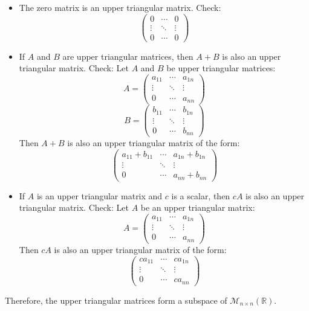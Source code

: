 \documentclass{article}
\begin{document}
\begin{itemize}
\item The zero matrix is an upper triangular matrix. Check:
\[
\begin{pmatrix}
0 & \cdots & 0 \\
\vdots & \ddots & \vdots \\
0 & \cdots & 0
\end{pmatrix}
\]
\item If $A$ and $B$ are upper triangular matrices, then $A + B$ is also an upper triangular matrix. Check:
Let $A$ and $B$ be upper triangular matrices:
\[
A = \begin{pmatrix}
a_{11} & \cdots & a_{1n} \\
\vdots & \ddots & \vdots \\
0 & \cdots & a_{nn}
\end{pmatrix}
\]
\[
B = \begin{pmatrix}
b_{11} & \cdots & b_{1n} \\
\vdots & \ddots & \vdots \\
0 & \cdots & b_{nn}
\end{pmatrix}
\]
Then $A + B$ is also an upper triangular matrix of the form:
\[
\begin{pmatrix}
a_{11} + b_{11} & \cdots & a_{1n} + b_{1n} \\
\vdots & \ddots & \vdots \\
0 & \cdots & a_{nn} + b_{nn}
\end{pmatrix}
\]
\item If $A$ is an upper triangular matrix and $c$ is a scalar, then $cA$ is also an upper triangular matrix. Check:
Let $A$ be an upper triangular matrix:
\[
A = \begin{pmatrix}
a_{11} & \cdots & a_{1n} \\
\vdots & \ddots & \vdots \\
0 & \cdots & a_{nn}
\end{pmatrix}
\]
Then $cA$ is also an upper triangular matrix of the form:
\[
\begin{pmatrix}
ca_{11} & \cdots & ca_{1n} \\
\vdots & \ddots & \vdots \\
0 & \cdots & ca_{nn}
\end{pmatrix}
\]
\end{itemize}

Therefore, the upper triangular matrices form a subspace of $\mathcal{M}_{n\times n}(\mathbb{R})$.


\newpage
\end{document}
